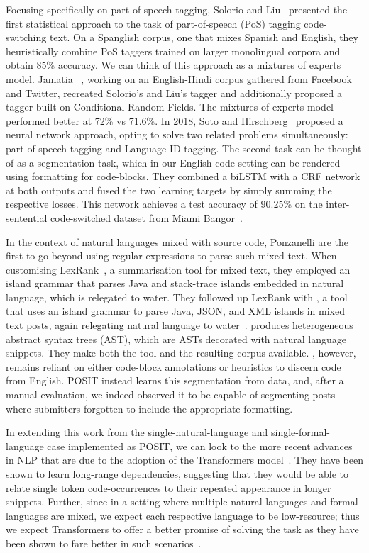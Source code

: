 Focusing specifically on part-of-speech tagging, Solorio and
Liu~\cite{Solorio2008} presented the first statistical approach to the task of
part-of-speech (PoS) tagging code-switching text. On a Spanglish corpus, one
that mixes Spanish and English, they heuristically combine PoS taggers trained
on larger monolingual corpora and obtain 85\% accuracy. We can think of this
approach as a mixtures of experts model. Jamatia \etal~\cite{Jamatia2015},
working on an English-Hindi corpus gathered from Facebook and Twitter, recreated
Solorio's and Liu's tagger and additionally proposed a tagger built on
Conditional Random Fields. The mixtures of experts model performed better at
72\% vs 71.6\%. In 2018, Soto and Hirschberg~\cite{Soto2018} proposed a neural
network approach, opting to solve two related problems simultaneously:
part-of-speech tagging and Language ID tagging. The second task can be thought
of as a segmentation task, which in our English-code setting can be rendered
using formatting for code-blocks. They combined a biLSTM with a CRF network at both outputs and fused the
two learning targets by simply summing the respective losses. This network
achieves a test accuracy of 90.25\% on the inter-sentential code-switched
dataset from Miami Bangor~\cite{bangorTalk}.

In the context of natural languages mixed with source code, Ponzanelli \etal are
the first to go beyond using regular expressions to parse such mixed text. When
customising LexRank~\cite{Ponzanelli2015b}, a summarisation tool for mixed text,
they employed an island grammar that parses Java and stack-trace islands
embedded in natural language, which is relegated to water. They followed up
LexRank with \stormed, a tool that uses an island grammar to parse Java, JSON,
and XML islands in mixed text \SO posts, again relegating natural language to
water~\cite{Ponzanelli2015a}.  \stormed produces heterogeneous abstract syntax
trees (AST), which are ASTs decorated with natural language snippets. They make
both the tool and the resulting corpus available. \stormed, however, remains
reliant on either code-block annotations or heuristics to discern code from
English. POSIT instead learns this segmentation from data, and, after a manual
evaluation, we indeed observed it to be capable of segmenting \SO posts where
submitters forgotten to include the appropriate formatting.

In extending this work from the single-natural-language and
single-formal-language case implemented as POSIT, we can look to the more recent
advances in NLP that are due to the adoption of the Transformers
model~\cite{vaswani2017attention, wang2019language}. They have been shown to
learn long-range dependencies, suggesting that they would be able to relate
single token code-occurrences to their repeated appearance in longer snippets.
Further, since in a setting where multiple natural languages and formal
languages are mixed, we expect each respective language to be low-resource; thus
we expect Transformers to offer a better promise of solving the task as they
have been shown to fare better in such scenarios~\cite{lakew2017multilingual}.